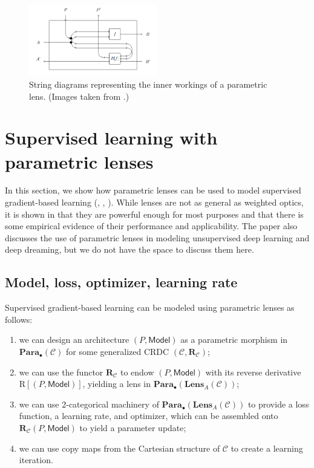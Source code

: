 \documentclass[11pt,a4paper,openright,twoside]{report}
\theoremstyle{plain}
\theoremstyle{definition}
\begin{document}
\begin{figure}[h]
  \begin{center}
    \includegraphics[width=0.5\textwidth]{figures/parametric_lens.png}             
    \caption[Parametric lens]{String diagrams representing the inner workings of a parametric lens. (Images taken from \cite{cruttwell2022categorical}.)}
    \label{fig: paralenses}
  \end{center}
\end{figure}





\section{Supervised learning with parametric lenses}
\label{sec: opticbasedlearning}

In this section, we show how parametric lenses can be used to model supervised gradient-based learning (\cite{cruttwell2022categorical}, \cite{gavranovic2024fundamental}, \cite{shiebler2021category}). While lenses are not as general as weighted optics, it is shown in \cite{cruttwell2022categorical} that they are powerful enough for most purposes and that there is some empirical evidence of their performance and applicability. The paper also discusses the use of parametric lenses in modeling unsupervised deep learning and deep dreaming, but we do not have the space to discuss them here.

\subsection{Model, loss, optimizer, learning rate}

Supervised gradient-based learning can be modeled using parametric lenses as follows:
\begin{enumerate}
  \item  we can design an architecture $(P,\mathsf{Model})$ as a parametric morphism in $\mathbf{Para}_{\bullet}(\mathcal{C})$ for some generalized CRDC $(\mathcal{C},\mathbf{R}_{\mathcal{C}})$;
  \item we can use the functor $\mathbf{R}_{\mathcal{C}}$ to endow $(P,\mathsf{Model})$ with its reverse derivative $\mathrm{R}[(P,\mathsf{Model})]$, yielding a lens in $\mathbf{Para}_{\bullet}(\mathbf{Lens}_A(\mathcal{C}))$;
  \item we can use $2$-categorical machinery of $\mathbf{Para}_{\bullet}(\mathbf{Lens}_A(\mathcal{C}))$ to provide a loss function, a learning rate, and optimizer, which can be assembled onto $\mathbf{R}_{\mathcal{C}}(P,\mathsf{Model})$ to yield a parameter update;
  \item we can use copy maps from the Cartesian structure of $\mathcal{C}$ to create a learning iteration.
\end{enumerate}
\end{document}
